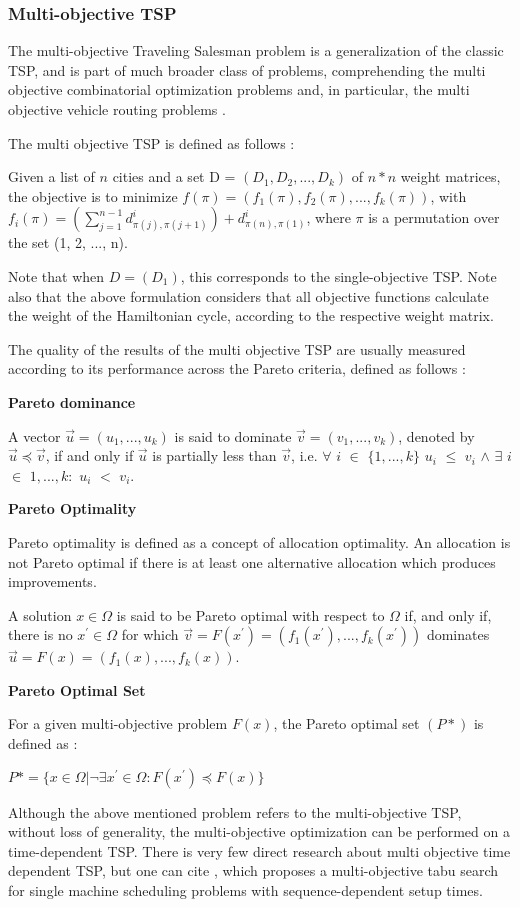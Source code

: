 \subsubsection{Multi-objective TSP}
\label{sec:multi-objective-tsp}

The multi-objective Traveling Salesman problem is a generalization of the classic TSP, and is part of much broader class of problems, comprehending the multi objective combinatorial optimization problems \cite{multi_objective_cop} and, in particular, the multi objective vehicle routing problems \cite{multi_objective_vrp}.

The multi objective TSP is defined as follows \cite{moea_for_motsp}:

Given a list of $n$ cities and a set D = $(D_1, D_2, ..., D_k)$ of $n*n$ weight matrices, the objective is to minimize $f(\pi) = (f_1(\pi), f_2(\pi), ..., f_k(\pi))$, with $f_i(\pi) = (\sum_{j=1}^{n-1} d_{\pi(j),\pi(j+1)}^i) + d_{\pi(n), \pi(1)}^i$, where $\pi$ is a permutation over the set (1, 2, ..., n). 

Note that when $ D = (D_1)$, this corresponds to the single-objective TSP. Note also that the above formulation considers that all objective functions calculate the weight of the Hamiltonian cycle, according to the respective weight matrix.

The quality of the results of the multi objective TSP are usually measured  according to its performance across the Pareto criteria, defined as follows \cite{pareto}:


\textbf{Pareto dominance}

A vector $\vec{u} = (u_1, ..., u_k)$ is said to dominate $\vec{v} = (v_1, ..., v_k)$, denoted by $\vec{u} \preceq \vec{v}$, if and only if $\vec{u}$ is partially less than $\vec{v}$, i.e. $\forall$ $i$ $\in$ $\{1, ..., k\}$ $u_i$ $\leq$ $v_i$ $\land$ $\exists$ $i$ $\in$ ${1,...,k}:$ $u_i$ $<$ $v_i$.


\textbf{Pareto Optimality}

Pareto optimality is defined as a concept of allocation optimality. An allocation is not Pareto optimal if there is at least one alternative allocation which produces improvements.

A solution $x \in \Omega$ is said to be Pareto optimal with respect to $\Omega$ if, and only if, there is no $x^{'} \in \Omega$ for which $\vec{v}=F(x^{'})=(f_1(x^{'}), ...,f_k(x^{'}))$ dominates $\vec{u}=F(x)=(f_1(x), ...,f_k(x))$.


\textbf{Pareto Optimal Set}

For a given multi-objective problem $F(x)$, the Pareto optimal set $(P*)$ is defined as :

$P* = \{ x \in \Omega | \neg \exists x^{'} \in \Omega : F(x^{'}) \preceq F(x) \}$


Although the above mentioned problem refers to the multi-objective TSP, without loss of generality, the multi-objective optimization can be performed on a time-dependent TSP. There is very few direct research about multi objective time dependent TSP, but one can cite \cite{multi_objective_machine_sequencing}, which proposes a multi-objective tabu search for single machine scheduling problems with sequence-dependent setup times.


